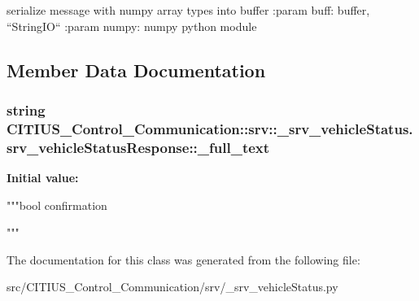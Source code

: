 \begin{DoxyVerb}
serialize message with numpy array types into buffer
:param buff: buffer, ``StringIO``
:param numpy: numpy python module
\end{DoxyVerb}
 

\subsection{\-Member \-Data \-Documentation}
\hypertarget{class_c_i_t_i_u_s___control___communication_1_1srv_1_1__srv__vehicle_status_1_1srv__vehicle_status_response_adc20dec35ba159d9261652e17bd9b25e}{
\subsubsection[{\-\_\-full\-\_\-text}]{\setlength{\rightskip}{0pt plus 5cm}string \-C\-I\-T\-I\-U\-S\-\_\-\-Control\-\_\-\-Communication\-::srv\-::\-\_\-srv\-\_\-vehicle\-Status.\-srv\-\_\-vehicle\-Status\-Response\-::\-\_\-full\-\_\-text}}\label{class_c_i_t_i_u_s___control___communication_1_1srv_1_1__srv__vehicle_status_1_1srv__vehicle_status_response_adc20dec35ba159d9261652e17bd9b25e}
{\bfseries \-Initial value\-:}
\begin{DoxyCode}
"""bool confirmation

"""
\end{DoxyCode}


\-The documentation for this class was generated from the following file\-:\begin{DoxyCompactItemize}
\item 
src/\-C\-I\-T\-I\-U\-S\-\_\-\-Control\-\_\-\-Communication/srv/\-\_\-srv\-\_\-vehicle\-Status.\-py\end{DoxyCompactItemize}
